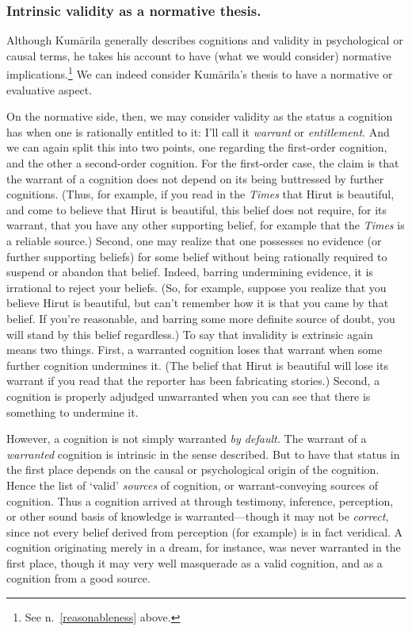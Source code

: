﻿\documentclass[11pt]{amsart}
\begin{document}


\subsubsection*{Intrinsic validity as a normative thesis.} Although Kum\=arila generally describes cognitions and validity in psychological or causal terms, he takes his account to have (what we would consider) normative implications.\footnote{See n.~\ref{reasonableness} above.} We can indeed consider Kum\=arila's thesis to have a normative or evaluative aspect.

On the normative side, then, we may consider validity as the status a cognition has when one is rationally entitled to it: I'll call it \emph{warrant} or \emph{entitlement}. And we can again split this into two points, one regarding the first-order cognition, and the other a second-order cognition. For the first-order case, the claim is that the warrant of a cognition does not depend on its being buttressed by further cognitions. (Thus, for example, if you read in the \emph{Times} that Hirut is beautiful, and come to believe that Hirut is beautiful, this belief does not require, for its warrant, that you have any other supporting belief, for example that the \emph{Times} is a reliable source.) Second, one may realize that one possesses no evidence (or further supporting beliefs) for some belief without being rationally required to suspend or abandon that belief. Indeed, barring undermining evidence, it is irrational to reject your beliefs.  (So, for example, suppose you realize that you believe Hirut is beautiful, but can't remember how it is that you came by that belief. If you're reasonable, and barring some more definite source of doubt, you will stand by this belief regardless.) To say that invalidity is extrinsic again means two things. First, a warranted cognition loses that warrant when some further cognition undermines it. (The belief that Hirut is beautiful will lose its warrant if you read that the reporter has been fabricating stories.) Second, a cognition is properly adjudged unwarranted when you can see that there is something to undermine it.

However, a cognition is not simply warranted \emph{by default.} The warrant of a \emph{warranted} cognition is intrinsic in the sense described. But to have that status in the first place depends on the causal or psychological origin of the cognition. Hence the list of `valid' \emph{sources} of cognition, or warrant-conveying sources of cognition. Thus a cognition arrived at through testimony, inference, perception, or other sound basis of knowledge is warranted---though it may not be \emph{correct}, since not every belief derived from perception (for example) is in fact veridical. A cognition originating merely in a dream, for instance, was never warranted in the first place, though it may very well masquerade as a valid cognition, and as a cognition from a good source.
\end{document}
